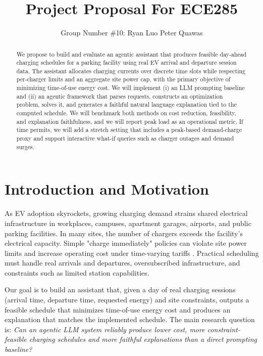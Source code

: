 \documentclass{article}
\title{Project Proposal For ECE285}
\author{%
  Group Number \#10: Ryan Luo
  \And
  Peter Quawas \\
  \And
}
\begin{document}
\maketitle

\begin{abstract}
We propose to build and evaluate an agentic assistant that produces feasible day-ahead charging schedules for a parking facility using real EV arrival and departure session data. The assistant allocates charging currents over discrete time slots while respecting per-charger limits and an aggregate site power cap, with the primary objective of minimizing time-of-use energy cost. We will implement (i) an LLM prompting baseline and (ii) an agentic framework that parses requests, constructs an optimization problem, solves it, and generates a faithful natural language explanation tied to the computed schedule. We will benchmark both methods on cost reduction, feasibility, and explanation faithfulness, and we will report peak load as an operational metric. If time permits, we will add a stretch setting that includes a peak-based demand-charge proxy and support interactive what-if queries such as charger outages and demand surges.
\end{abstract}

\section{Introduction and Motivation}
As EV adoption skyrockets, growing charging demand strains shared electrical infrastructure in workplaces, campuses, apartment garages, airports, and public parking facilities. In many sites, the number of chargers exceeds the facility's electrical capacity. Simple "charge immediately" policies can violate site power limits and increase operating cost under time-varying tariffs \cite{lee2020acn}. Practical scheduling must handle real arrivals and departures, oversubscribed infrastructure, and constraints such as limited station capabilities.

Our goal is to build an assistant that, given a day of real charging sessions (arrival time, departure time, requested energy) and site constraints, outputs a feasible schedule that minimizes time-of-use energy cost and produces an explanation that matches the implemented schedule. The main research question is: \textit{Can an agentic LLM system reliably produce lower cost, more constraint-feasible charging schedules and more faithful explanations than a direct prompting baseline?}
\end{document}
